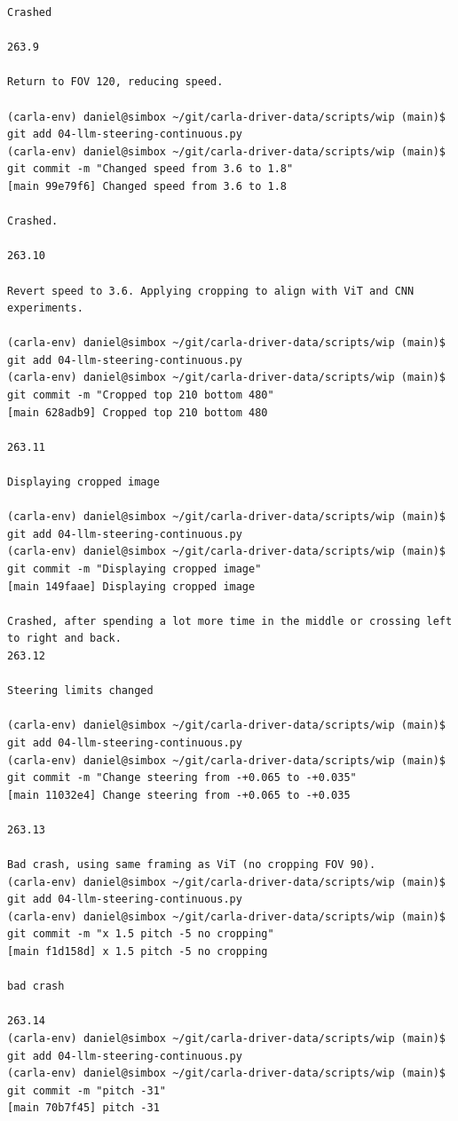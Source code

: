 \begin{verbatim}
Crashed

263.9

Return to FOV 120, reducing speed.

(carla-env) daniel@simbox ~/git/carla-driver-data/scripts/wip (main)$ git add 04-llm-steering-continuous.py 
(carla-env) daniel@simbox ~/git/carla-driver-data/scripts/wip (main)$ git commit -m "Changed speed from 3.6 to 1.8"
[main 99e79f6] Changed speed from 3.6 to 1.8

Crashed.

263.10

Revert speed to 3.6. Applying cropping to align with ViT and CNN experiments.

(carla-env) daniel@simbox ~/git/carla-driver-data/scripts/wip (main)$ git add 04-llm-steering-continuous.py 
(carla-env) daniel@simbox ~/git/carla-driver-data/scripts/wip (main)$ git commit -m "Cropped top 210 bottom 480"
[main 628adb9] Cropped top 210 bottom 480

263.11

Displaying cropped image

(carla-env) daniel@simbox ~/git/carla-driver-data/scripts/wip (main)$ git add 04-llm-steering-continuous.py 
(carla-env) daniel@simbox ~/git/carla-driver-data/scripts/wip (main)$ git commit -m "Displaying cropped image"
[main 149faae] Displaying cropped image

Crashed, after spending a lot more time in the middle or crossing left to right and back.
263.12

Steering limits changed

(carla-env) daniel@simbox ~/git/carla-driver-data/scripts/wip (main)$ git add 04-llm-steering-continuous.py 
(carla-env) daniel@simbox ~/git/carla-driver-data/scripts/wip (main)$ git commit -m "Change steering from -+0.065 to -+0.035"
[main 11032e4] Change steering from -+0.065 to -+0.035

263.13

Bad crash, using same framing as ViT (no cropping FOV 90).
(carla-env) daniel@simbox ~/git/carla-driver-data/scripts/wip (main)$ git add 04-llm-steering-continuous.py 
(carla-env) daniel@simbox ~/git/carla-driver-data/scripts/wip (main)$ git commit -m "x 1.5 pitch -5 no cropping"
[main f1d158d] x 1.5 pitch -5 no cropping

bad crash

263.14
(carla-env) daniel@simbox ~/git/carla-driver-data/scripts/wip (main)$ git add 04-llm-steering-continuous.py 
(carla-env) daniel@simbox ~/git/carla-driver-data/scripts/wip (main)$ git commit -m "pitch -31"
[main 70b7f45] pitch -31


\end{verbatim}
